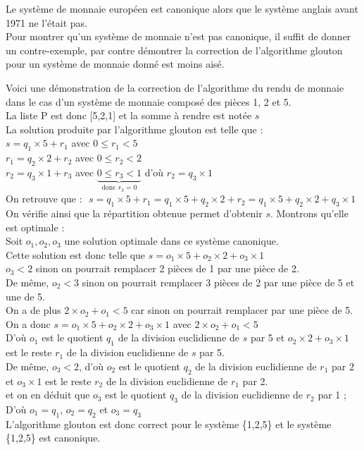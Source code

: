 \documentclass[12pt,french]{article}
\begin{document}
Le système de monnaie européen est canonique alors que le système anglais avant 1971 ne l'était pas.\\
Pour montrer qu'un système de monnaie n'est pas canonique, il suffit de donner un contre-exemple, par contre démontrer la correction de l'algorithme glouton pour un système de monnaie donné est moins aisé.
\small
\begin{tcolorbox}[enhanced,attach boxed title to top center={yshift=-3mm,yshifttext=-1mm},
	colback=gray!5!white,colframe=gray!75!black,colbacktitle=gray!25!black,
	title= preuve de correction pour un système simple , fonttitle=\bfseries,
	boxed title style={size=small,colframe=gray!25!black} ]
	Voici une démonstration de la correction de l'algorithme du rendu de monnaie dans le cas d'un système de monnaie composé des pièces 1, 2 et 5.\\
	La liste P est donc [5,2,1] et la somme à rendre est notée $s$\\
	La solution produite par l'algorithme glouton est telle que :\\
	$s = q_1 \times 5 + r_1$ avec $0\leqslant r_1<5$\\
	$r_1=q_2\times 2 +r_2$   avec $0\leqslant r_2<2$\\
	$r_2= q_3 \times 1 + r_3$  avec $\underbrace{0\leqslant r_3<1}_{\text{donc } r_3=0}$ d'où $r_2= q_3 \times 1$\\
	On retrouve que :\,\,	$s=q_1 \times 5 + r_1=q_1 \times 5 + q_2\times 2 +r_2=q_1 \times 5 + q_2\times 2 +q_3 \times 1$\\
	On vérifie ainsi que la répartition obtenue permet d'obtenir $s$. Montrons qu'elle est optimale :\\
	Soit $o_1,o_2,o_3$ une solution optimale dans ce système canonique.\\
	Cette solution est donc telle que $s=o_1 \times 5 + o_2\times 2 +o_3 \times 1$\\
	$o_3<2$ sinon on pourrait remplacer 2 pièces de 1 par une pièce de 2.\\
	De même, $o_2<3$ sinon on pourrait remplacer 3 pièces de 2 par une pièce de 5 et une de 5.\\
	On a de plus $2\times o_2+o_1<5$ car sinon on pourrait remplacer par une pièce de 5.\\
	On a donc $s=o_1 \times 5 + o_2\times 2 +o_3 \times 1$ avec  $2\times o_2+o_1<5$\\
	D'où $o_1$ est le quotient $q_1$ de la division euclidienne de $s$ par 5 et $o_2\times 2 +o_3 \times 1$ est le reste $r_1$ de la division euclidienne de $s$ par 5.\\
	De même, $o_3<2$, d'où $o_2$ est le quotient $q_2$ de la division euclidienne de $r_1$ par 2 et $o_3 \times 1$ est le reste $r_2$ de la division euclidienne de $r_1$ par 2.\\
	et on en déduit que $o_3$ est le quotient $q_3$ de la division euclidienne de $r_2$ par 1 ;\\
	D'où $o_1=q_1$, $o_2=q_2$ et $o_3=q_3$ \\
	L'algorithme glouton est donc correct pour le système \{1,2,5\} et le système \{1,2,5\} est canonique.
\end{tcolorbox}
\normalsize
\end{document}

